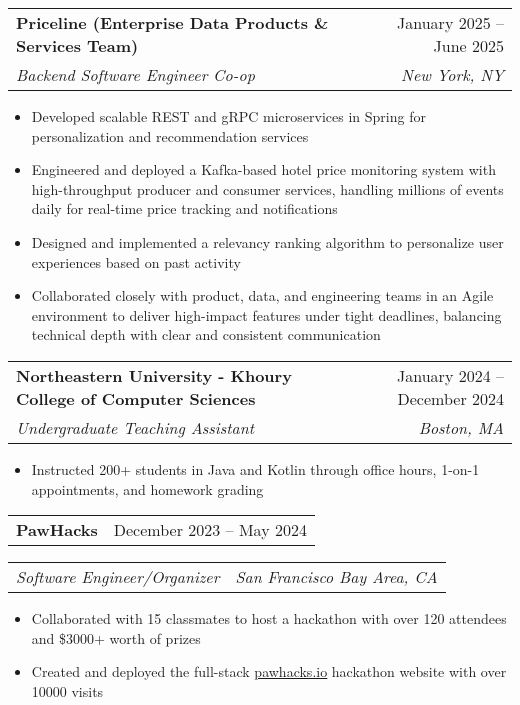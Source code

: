 \documentclass[letterpaper,11pt]{article}
\makeatletter
\newcommand{\resumeItem}[1]{
  \item\small{
    {#1 \vspace{-2pt}}
  }
}
\newcommand{\resumeSubheading}[4]{
  \vspace{-2pt}\item
    \begin{tabular*}{0.97\textwidth}[t]{l@{\extracolsep{\fill}}r}
      \textbf{#1} & #2 \\
      \textit{\small#3} & \textit{\small #4} \\
    \end{tabular*}\vspace{-7pt}
}
\newcommand{\resumeSubheadingSmall}[2]{
  \vspace{-2pt}\item
    \begin{tabular*}{0.97\textwidth}[t]{l@{\extracolsep{\fill}}r}
      \textbf{#1} & #2 \\
    \end{tabular*}\vspace{-9pt}
}
\newcommand{\resumeSubSubheading}[2]{
    \item
    \begin{tabular*}{0.97\textwidth}{l@{\extracolsep{\fill}}r}
      \textit{\small#1} & \textit{\small #2} \\
    \end{tabular*}\vspace{-7pt}
}
\newcommand{\resumeItemListStart}{\begin{itemize}}
\newcommand{\resumeItemListEnd}{\end{itemize}\vspace{-5pt}}
\makeatother
\begin{document}
  \resumeSubheading
  {Priceline (Enterprise Data Products \& Services Team)}{January 2025 -- June 2025}
  {Backend Software Engineer Co-op}{New York, NY}
  \resumeItemListStart
    \resumeItem{Developed scalable REST and gRPC microservices in Spring for personalization and recommendation services}%
    \resumeItem{Engineered and deployed a Kafka-based hotel price monitoring system with high-throughput producer and consumer services, handling millions of events daily for real-time price tracking and notifications}
    \resumeItem{Designed and implemented a relevancy ranking algorithm to personalize user experiences based on past activity}
    \resumeItem{Collaborated closely with product, data, and engineering teams in an Agile environment to deliver high-impact features under tight deadlines, balancing technical depth with clear and consistent communication}%
  \resumeItemListEnd

  \resumeSubheading
    {Northeastern University - Khoury College of Computer Sciences}{January 2024 -- December 2024}
    {Undergraduate Teaching Assistant}{Boston, MA}
    \resumeItemListStart
      \resumeItem{Instructed 200+ students in Java and Kotlin through office hours, 1-on-1 appointments, and homework grading}
    \resumeItemListEnd
    
  \resumeSubheadingSmall{PawHacks}{December 2023 -- May 2024}
    \resumeSubSubheading
    {Software Engineer/Organizer}{San Francisco Bay Area, CA}%
    \resumeItemListStart
      \resumeItem{Collaborated with 15 classmates to host a hackathon with over 120 attendees and \$3000+ worth of prizes}
      \resumeItem{Created and deployed the full-stack \href{https://web.archive.org/web/20241229024348/https://pawhacks.io/}{\underline{pawhacks.io}} hackathon website with over 10000 visits}
    \resumeItemListEnd
\end{document}
